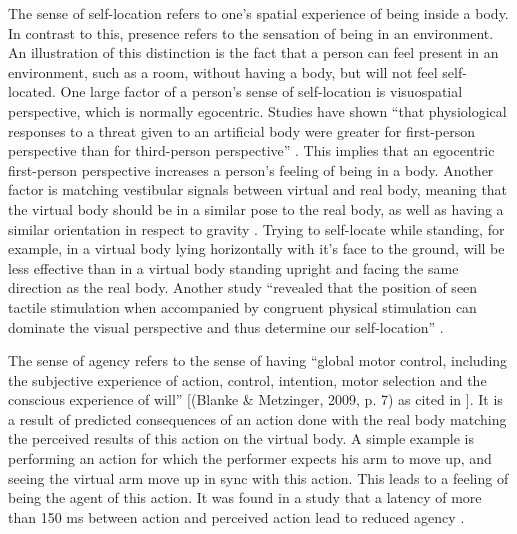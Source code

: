 The sense of self-location refers to one's spatial experience of being inside a body. In contrast to this, presence refers to the sensation of being in an environment. An illustration of this distinction is the fact that a person can feel present in an environment, such as a room, without having a body, but will not feel self-located. 
\newline
One large factor of a person's sense of self-location is visuospatial perspective, which is normally egocentric. Studies have shown \enquote{that physiological responses to a threat given to an artificial body were greater for first-person perspective than for third-person perspective} \autocite[p. ~4]{senseEmbodimentVR}. This implies that an egocentric first-person perspective increases a person's feeling of being in a body.
\newline
Another factor is matching vestibular signals between virtual and real body, meaning that the virtual body should be in a similar pose to the real body, as well as having a similar orientation in respect to gravity \autocite{senseEmbodimentVR}. Trying to self-locate while standing, for example, in a virtual body lying horizontally with it's face to the ground, will be less effective than in a virtual body standing upright and facing the same direction as the real body.
\newline
Another study \enquote{revealed that the position of seen tactile stimulation when accompanied by congruent physical stimulation can dominate the visual perspective and thus determine our self-location} \autocite[p. ~4]{senseEmbodimentVR}.
\newline

The sense of agency refers to the sense of having \enquote{global motor control, including the subjective experience of action, control, intention, motor selection and the conscious experience of will} [(Blanke \& Metzinger, 2009, p. 7) as cited in \autocite[p. ~4]{senseEmbodimentVR}]. It is a result of predicted consequences of an action done with the real body matching the perceived results of this action on the virtual body. A simple example is performing an action for which the performer expects his arm to move up, and seeing the virtual arm move up in sync with this action. This leads to a feeling of being the agent of this action. It was found in a study that a latency of more than 150 ms between action and perceived action lead to reduced agency \autocite[p. ~5]{senseEmbodimentVR}.
\newline

